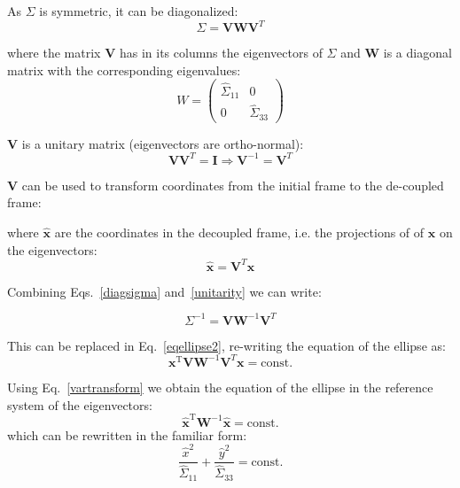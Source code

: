 \begin{appendices}
As $\Sigma$ is symmetric, it can be diagonalized:
\begin{equation}
\Sigma = \textbf{V} \textbf{W} \textbf{V}^{T}
\label{diagsigma}
\end{equation}

where the matrix $\textbf{V}$ has in its columns the eigenvectors of $\Sigma$ and $\textbf{W}$ is a diagonal matrix with the corresponding eigenvalues:
\begin{equation}
W = \left(
\begin{matrix}
\hat{\Sigma}_{11} & 0\\
0 & \hat{\Sigma}_{33}
\end{matrix}
\right)
\end{equation}

 $\textbf{V}$ is a unitary matrix (eigenvectors are ortho-normal):
\begin{equation}
\textbf{V} \textbf{V}^{T} = \textbf{I} \Rightarrow \textbf{V}^{-1} = \textbf{V}^{T}
\label{unitarity}
\end{equation}

\textbf{V} can be used to transform coordinates from the initial frame to the de-coupled frame:

where $\hat{\textbf{x}}$ are the coordinates in the decoupled frame, i.e. the projections of of $\textbf{x}$ on the eigenvectors:
\begin{equation}
\hat{\textbf{x}}= \textbf{V}^{T}\textbf{x}
\label{vartransform}
\end{equation}

Combining Eqs.~\ref{diagsigma} and~\ref{unitarity} we can write:

\begin{equation}
\Sigma^{-1} = \textbf{V} \textbf{W}^{-1} \textbf{V}^{T}
\end{equation}

This can be replaced in Eq.~\ref{eqellipse2}, re-writing the equation of the ellipse as:
\begin{equation}
\textbf{x}^\mathrm{T}\textbf{V} \textbf{W}^{-1} \textbf{V}^{T}\textbf{x} = \mathrm{const.}
\end{equation}

Using Eq.~\ref{vartransform} we obtain the equation of the ellipse in the reference system of the eigenvectors:
\begin{equation}
\hat{\textbf{x}}^\mathrm{T}\textbf{W}^{-1} \hat{\textbf{x}} = \mathrm{const.}
\end{equation}
which can be rewritten in the familiar form:
\begin{equation}
\frac{\hat{x}^2}{\hat{\Sigma}_{11}}+\frac{\hat{y}^2}{\hat{\Sigma}_{33}}=\mathrm{const.}
\end{equation}


\end{appendices}
